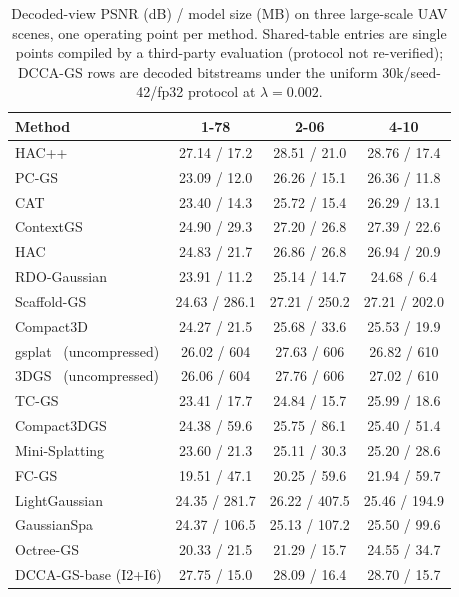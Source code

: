 \documentclass[conference]{IEEEtran}
\newcommand{\DCCA}{DCCA-GS}
\begin{document}
\begin{table}[t]
\centering
\caption{Decoded-view PSNR (dB) / model size (MB) on three large-scale UAV
scenes, one operating point per method. Shared-table entries are single
points compiled by a third-party evaluation (protocol not re-verified);
\DCCA{} rows are decoded bitstreams under the uniform 30k/seed-42/fp32
protocol at $\lambda{=}0.002$.}
\label{tab:main}
\small
\begin{tabular}{lccc}
\toprule
Method & 1-78 & 2-06 & 4-10 \\
\midrule
HAC++~\cite{chen2025} & 27.14 / 17.2 & 28.51 / 21.0 & 28.76 / 17.4 \\
PC-GS & 23.09 / 12.0 & 26.26 / 15.1 & 26.36 / 11.8 \\
CAT & 23.40 / 14.3 & 25.72 / 15.4 & 26.29 / 13.1 \\
ContextGS~\cite{wang2024b} & 24.90 / 29.3 & 27.20 / 26.8 & 27.39 / 22.6 \\
HAC~\cite{chen2024} & 24.83 / 21.7 & 26.86 / 26.8 & 26.94 / 20.9 \\
RDO-Gaussian~\cite{wang2024a} & 23.91 / 11.2 & 25.14 / 14.7 & 24.68 / 6.4 \\
Scaffold-GS~\cite{lu2024} & 24.63 / 286.1 & 27.21 / 250.2 & 27.21 / 202.0 \\
Compact3D & 24.27 / 21.5 & 25.68 / 33.6 & 25.53 / 19.9 \\
gsplat~\cite{ye2024gsplat} (uncompressed) & 26.02 / 604 & 27.63 / 606 & 26.82 / 610 \\
3DGS~\cite{kerbl2023} (uncompressed) & 26.06 / 604 & 27.76 / 606 & 27.02 / 610 \\
TC-GS & 23.41 / 17.7 & 24.84 / 15.7 & 25.99 / 18.6 \\
Compact3DGS~\cite{lee2024} & 24.38 / 59.6 & 25.75 / 86.1 & 25.40 / 51.4 \\
Mini-Splatting~\cite{fang2024} & 23.60 / 21.3 & 25.11 / 30.3 & 25.20 / 28.6 \\
FC-GS & 19.51 / 47.1 & 20.25 / 59.6 & 21.94 / 59.7 \\
LightGaussian~\cite{fan2024} & 24.35 / 281.7 & 26.22 / 407.5 & 25.46 / 194.9 \\
GaussianSpa~\cite{zhang2025gaussianspa} & 24.37 / 106.5 & 25.13 / 107.2 & 25.50 / 99.6 \\
Octree-GS & 20.33 / 21.5 & 21.29 / 15.7 & 24.55 / 34.7 \\
\midrule
\DCCA{}-base (I2+I6) & 27.75 / 15.0 & 28.09 / 16.4 & 28.70 / 15.7 \\
\bottomrule
\end{tabular}
\end{table}
\end{document}

